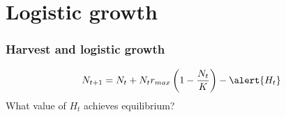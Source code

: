 \documentclass[color=usenames,dvipsnames]{beamer}\usepackage[]{graphicx}\usepackage[]{color}
\begin{document}
\section{Logistic growth}







\begin{frame}
  \frametitle{Harvest and logistic growth}
  \LARGE
  \[
    N_{t+1} = N_t + N_t r_{max}\left(1 - \frac{N_t}{K} \right) - \alert{H_t}
  \]
  \pause
  \vfill
  \Large
  \centering %
  What value of $H_t$ achieves equilibrium? \\
\end{frame}
\end{document}
